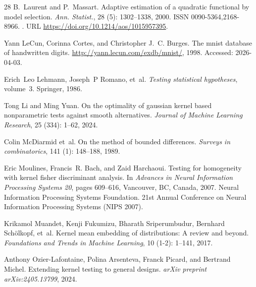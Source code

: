 \documentclass[twoside,11pt]{article}
\begin{document}
\begin{thebibliography}{28}
	B.~Laurent and P.~Massart.
	\newblock Adaptive estimation of a quadratic functional by model selection.
	\newblock \emph{Ann. Statist.}, 28 (5): 1302--1338, 2000.
	\newblock ISSN 0090-5364,2168-8966.
	\newblock {}.
	\newblock URL \url{https://doi.org/10.1214/aos/1015957395}.
	
	Yann LeCun, Corinna Cortes, and Christopher J.~C. Burges.
	\newblock The mnist database of handwritten digits.
	\newblock \url{http://yann.lecun.com/exdb/mnist/}, 1998.
	\newblock Accessed: 2026-04-03.
	
	Erich~Leo Lehmann, Joseph~P Romano, et~al.
	\newblock \emph{Testing statistical hypotheses}, volume~3.
	\newblock Springer, 1986.
	
	Tong Li and Ming Yuan.
	\newblock On the optimality of gaussian kernel based nonparametric tests
	against smooth alternatives.
	\newblock \emph{Journal of Machine Learning Research}, 25
	(334): 1--62, 2024.
	
	Colin McDiarmid et~al.
	\newblock On the method of bounded differences.
	\newblock \emph{Surveys in combinatorics}, 141 (1): 148--188,
	1989.
	
	Eric Moulines, Francis~R. Bach, and Zaid Harchaoui.
	\newblock Testing for homogeneity with kernel fisher discriminant analysis.
	\newblock In \emph{Advances in Neural Information Processing Systems 20}, pages
	609--616, Vancouver, BC, Canada, 2007. Neural Information Processing Systems
	Foundation.
	\newblock 21st Annual Conference on Neural Information Processing Systems (NIPS
	2007).
	
	Krikamol Muandet, Kenji Fukumizu, Bharath Sriperumbudur, Bernhard
	Sch{\"o}lkopf, et~al.
	\newblock Kernel mean embedding of distributions: A review and beyond.
	\newblock \emph{Foundations and Trends{\textregistered} in Machine Learning},
	10 (1-2): 1--141, 2017.
	
	Anthony Ozier-Lafontaine, Polina Arsenteva, Franck Picard, and Bertrand Michel.
	\newblock Extending kernel testing to general designs.
	\newblock \emph{arXiv preprint arXiv:2405.13799}, 2024{}.
	

\end{thebibliography}
\end{document}
